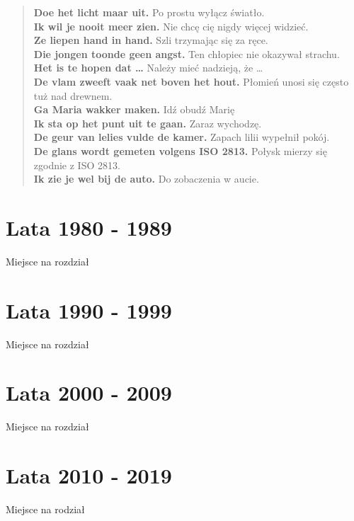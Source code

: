 \documentclass[
]{book}
\begin{document}
\begin{quote}
\textbf{Doe het licht maar uit.} Po prostu wyłącz światło.\\
\textbf{Ik wil je nooit meer zien.} Nie chcę cię nigdy więcej widzieć.\\
\textbf{Ze liepen hand in hand.} Szli trzymając się za ręce.\\
\textbf{Die jongen toonde geen angst.} Ten chłopiec nie okazywał strachu.\\
\textbf{Het is te hopen dat \ldots{}} Należy mieć nadzieją, że \ldots{}\\
\textbf{De vlam zweeft vaak net boven het hout.} Płomień unosi się często tuż nad drewnem.\\
\textbf{Ga Maria wakker maken.} Idź obudź Marię\\
\textbf{Ik sta op het punt uit te gaan.} Zaraz wychodzę.\\
\textbf{De geur van lelies vulde de kamer.} Zapach lilii wypełnił pokój.\\
\textbf{De glans wordt gemeten volgens ISO 2813.} Połysk mierzy się zgodnie z ISO 2813.\\
\textbf{Ik zie je wel bij de auto.} Do zobaczenia w aucie.
\end{quote}

\hypertarget{lata-1980---1989}{%
\chapter{Lata 1980 - 1989}\label{lata-1980---1989}}

Miejsce na rozdział

\hypertarget{lata-1990---1999}{%
\chapter{Lata 1990 - 1999}\label{lata-1990---1999}}

Miejsce na rozdział

\hypertarget{lata-2000---2009}{%
\chapter{Lata 2000 - 2009}\label{lata-2000---2009}}

Miejsce na rozdział

\hypertarget{lata-2010---2019}{%
\chapter{Lata 2010 - 2019}\label{lata-2010---2019}}

Miejsce na rodział

  
\end{document}
